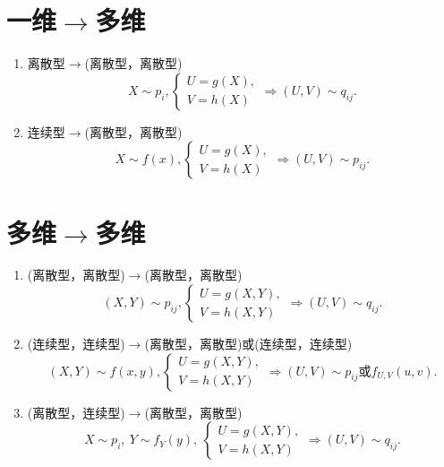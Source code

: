 \section{一维$\rightarrow$多维}
\begin{enumerate}
      \item 离散型$\rightarrow$(离散型，离散型)
            $$X\sim p_i,\begin{cases}U=g(X),\\V=h(X)\end{cases}\Rightarrow(U,V)\sim q_{ij}.$$
      \item 连续型$\rightarrow$(离散型，离散型)
            $$X\sim f(x),\begin{cases}U=g(X),\\V=h(X)\end{cases}\Rightarrow(U,V)\sim p_{ij}.$$
\end{enumerate}
\section{多维$\rightarrow$多维}

\begin{enumerate}
      \item (离散型，离散型)$\rightarrow$(离散型，离散型)
            $$(X,Y)\sim p_{ij},\begin{cases}U=g(X,Y),\\V=h(X,Y)\end{cases}\Rightarrow(U,V)\sim q_{ij}.$$
      \item (连续型，连续型)$\rightarrow$(离散型，离散型)或(连续型，连续型)
            $$(X,Y)\sim f(x,y),\begin{cases}U=g(X,Y),\\V=h(X,Y)\end{cases}\Rightarrow(U,V)\sim p_{ij}\text{或}f_{U,V}(u,v).$$
      \item (离散型，连续型)$\rightarrow$(离散型，离散型)
            $$X\sim p_i,\:Y\sim f_Y(y),\:\begin{cases}U=g(X,Y),\\V=h(X,Y)\end{cases}\Rightarrow(U,V)\sim q_{ij}.$$
\end{enumerate}